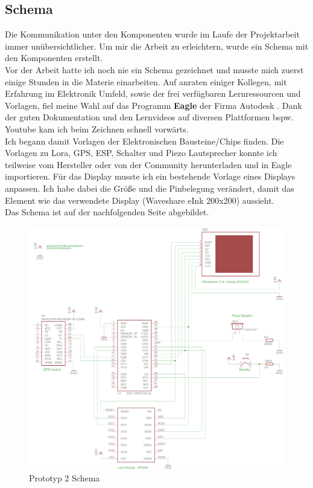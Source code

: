 \documentclass[11pt,english,german]{report}
\theoremstyle{definition}
\begin{document}
\subsection{Schema}
Die Kommunikation unter den Komponenten wurde im Laufe der Projektarbeit immer unübersichtlicher. Um mir die Arbeit zu erleichtern, wurde ein Schema mit den Komponenten erstellt.\\[0.3cm]
Vor der Arbeit hatte ich noch nie ein Schema gezeichnet und musste mich zuerst einige Stunden in die Materie einarbeiten. Auf anraten einiger Kollegen, mit Erfahrung im Elektronik Umfeld, sowie der frei verfügbaren Lernressourcen und Vorlagen, fiel meine Wahl auf das Programm \textbf{Eagle} der Firma Autodesk \cite{autodesk}. Dank der guten Dokumentation und den Lernvideos auf diversen Plattformen bspw. Youtube kam ich beim Zeichnen schnell vorwärts. \\[0.3cm] 
Ich begann damit Vorlagen der Elektronischen Bausteine/Chips finden. Die Vorlagen zu Lora, GPS, ESP, Schalter und Piezo Lautsprecher konnte ich teilweise vom Hersteller oder von der Community herunterladen und in Eagle importieren. Für das Display musste ich ein bestehende Vorlage eines Displays anpassen. Ich habe dabei die Größe und die Pinbelegung verändert, damit das Element wie das verwendete Display (Waveshare eInk 200x200) aussieht. \\[0.3cm]
Das Schema ist auf der nachfolgenden Seite abgebildet.
\newpage

\begin{figure}[H]
	\centering
	\includegraphics[width=\textwidth]{img/prototyp_schema.png}
	\caption[Prototyp2 Schema]
	{Prototyp 2 Schema}
\end{figure}
\end{document}

